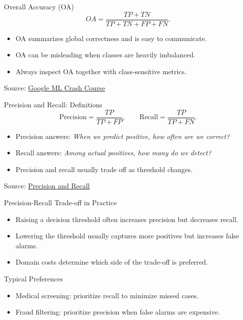 \documentclass[10pt]{beamer}
\begin{document}
\begin{frame}{Overall Accuracy (OA)}
  \justifying
  \[
    OA = \frac{TP + TN}{TP + TN + FP + FN}.
  \]
  \begin{itemize}
    \item OA summarizes global correctness and is easy to communicate.
    \item OA can be misleading when classes are heavily imbalanced.
    \item Always inspect OA together with class-sensitive metrics.
  \end{itemize}
  \vspace{0.3em}
  {\footnotesize Source: \href{https://developers.google.com/machine-learning/crash-course/classification/accuracy-precision-recall}{Google ML Crash Course}}
\end{frame}

\begin{frame}{Precision and Recall: Definitions}
  \justifying
  \[
    \mathrm{Precision} = \frac{TP}{TP + FP}, \qquad
    \mathrm{Recall} = \frac{TP}{TP + FN}.
  \]
  \begin{itemize}
    \item Precision answers: \emph{When we predict positive, how often are we correct?}
    \item Recall answers: \emph{Among actual positives, how many do we detect?}
    \item Precision and recall usually trade off as threshold changes.
  \end{itemize}
  \vspace{0.3em}
  {\footnotesize Source: \href{https://en.wikipedia.org/wiki/Precision_and_recall}{Precision and Recall}}
\end{frame}

\begin{frame}{Precision-Recall Trade-off in Practice}
  \justifying
  \begin{itemize}
    \item Raising a decision threshold often increases precision but decreases recall.
    \item Lowering the threshold usually captures more positives but increases false alarms.
    \item Domain costs determine which side of the trade-off is preferred.
  \end{itemize}
  \begin{examplebox}{Typical Preferences}
    \begin{itemize}
      \item Medical screening: prioritize recall to minimize missed cases.
      \item Fraud filtering: prioritize precision when false alarms are expensive.
    \end{itemize}
  \end{examplebox}
\end{frame}
\end{document}
